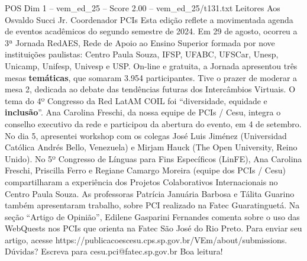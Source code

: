 \begin{textsample}{POS Dim 1 – vem\_ed\_25 – Score 2.00 – vem\_ed\_25/t131.txt}  \label{ex:f1_pos_003}
Leitores Aos Osvaldo Succi Jr.
Coordenador PCIs Esta edição reflete a movimentada agenda de eventos acadêmicos do segundo semestre de 2024.
Em 29 de agosto, ocorreu a 3ª Jornada RedAES, Rede de Apoio ao Ensino Superior formada por nove instituições paulistas: Centro Paula Souza, IFSP, UFABC, UFSCar, Unesp, Unicamp, Unifesp, Univesp e USP.
On-line e gratuita, a Jornada apresentou três mesas \textbf{temáticas}, que somaram 3.954 participantes.
Tive o prazer de moderar a mesa 2, dedicada ao debate das tendências futuras dos Intercâmbios Virtuais.
O tema do 4º Congresso da Red LatAM COIL foi “diversidade, equidade e \textbf{inclusão}”.
Ana Carolina Freschi, da nossa equipe de PCIs / Cesu, integra o conselho executivo da rede e participou da abertura do evento, em 4 de setembro.
No dia 5, apresentei workshop com os colegas José Luis Jiménez (Universidad Católica Andrés Bello, Venezuela) e Mirjam Hauck (The Open University, Reino Unido).
No 5º Congresso de Línguas para Fins Específicos (LinFE), Ana Carolina Freschi, Priscilla Ferro e Regiane Camargo Moreira (equipe dos PCIs / Cesu) compartilharam a experiência dos Projetos Colaborativos Internacionais no Centro Paula Souza.
As professoras Patrícia Januária Barbosa e Tálita Guarino também apresentaram trabalho, sobre PCI realizado na Fatec Guaratinguetá.
Na seção “Artigo de Opinião”, Edilene Gasparini Fernandes comenta sobre o uso das WebQuests nos PCIs que orienta na Fatec São José do Rio Preto.
Para enviar seu artigo, acesse https://publicacoescesu.cps.sp.gov.br/VEm/about/submissions.
Dúvidas?
Escreva para cesu.pci@fatec.sp.gov.br Boa leitura!

\end{textsample}
